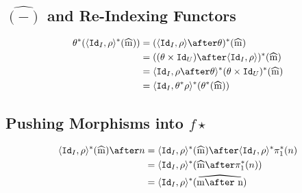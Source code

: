     \subsection{$\hat{(-)}$ and Re-Indexing Functors}
    \begin{align*}
        \theta\star(\pr{\Id{I}}{\rho}\star(\widehat{m})) &= (\pr{\Id{I}}{\rho}\after\theta)\star(\widehat{m})\\
        & = ((\theta\times\Id{U})\after\pr{\Id{I}}{\rho})\star(\widehat{m})\\
        & = \pr{\Id{I}}{\rho\after\theta}\star(\theta\times\Id{U})\star(\widehat{m}) \\
        & = \pr{\Id{I}}{\theta\star\rho}\star(\theta\star(\widehat{m}))
    \end{align*}

\subsection{Pushing Morphisms into $f\star$}

\begin{align*}
    \pr{\Id{I}}{\rho}\star(\widehat{m})\after n &= \pr{\Id{I}}{\rho}\star(\widehat{m})\after\pr{\Id{I}}{\rho}\star\p\star(n)\\
    & = \pr{\Id{I}}{\rho}\star(\widehat{m}\after\pstar(n))\\
    &= \pr{\Id{I}}{\rho}\star(\widehat{m\after n})
\end{align*}
